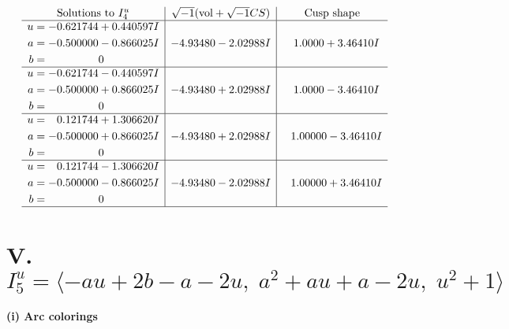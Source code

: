 \documentclass[1p]{elsarticle_modified}
\theoremstyle{definition}
\newcommand{\I}{\sqrt{-1}}
\begin{document}
$$\begin{array}{c|c|c}  
\text{Solutions to }I^u_{4}& \I (\text{vol} + \sqrt{-1}CS) & \text{Cusp shape}\\
 \hline 
\begin{aligned}
u &= -0.621744 + 0.440597 I \\
a &= -0.500000 - 0.866025 I \\
b &= \phantom{-0.000000 } 0\end{aligned}
 & -4.93480 - 2.02988 I & \phantom{-}1.0000 + 3.46410 I \\ \hline\begin{aligned}
u &= -0.621744 - 0.440597 I \\
a &= -0.500000 + 0.866025 I \\
b &= \phantom{-0.000000 } 0\end{aligned}
 & -4.93480 + 2.02988 I & \phantom{-}1.0000 - 3.46410 I \\ \hline\begin{aligned}
u &= \phantom{-}0.121744 + 1.306620 I \\
a &= -0.500000 + 0.866025 I \\
b &= \phantom{-0.000000 } 0\end{aligned}
 & -4.93480 + 2.02988 I & \phantom{-}1.00000 - 3.46410 I \\ \hline\begin{aligned}
u &= \phantom{-}0.121744 - 1.306620 I \\
a &= -0.500000 - 0.866025 I \\
b &= \phantom{-0.000000 } 0\end{aligned}
 & -4.93480 - 2.02988 I & \phantom{-}1.00000 + 3.46410 I\\
 \hline 
 \end{array}$$\newpage\newpage\renewcommand{\arraystretch}{1}
\centering \section*{V. $I^u_{5}= \langle - a u+2 b- a-2 u,\;a^2+a u+a-2 u,\;u^2+1 \rangle$}
\flushleft \textbf{(i) Arc colorings}\\
\end{document}
